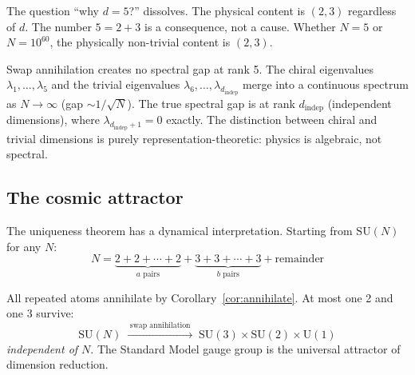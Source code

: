 \begin{remark}
\begin{corollary}
The question ``why $d = 5$?'' dissolves. The physical content is $(2, 3)$ regardless of $d$. The number $5 = 2 + 3$ is a consequence, not a cause. Whether $N = 5$ or $N = 10^{60}$, the physically non-trivial content is $(2, 3)$.
\end{corollary}

\begin{remark}
Swap annihilation creates no spectral gap at rank 5. The chiral eigenvalues $\lambda_1, \ldots, \lambda_5$ and the trivial eigenvalues $\lambda_6, \ldots, \lambda_{d_\text{indep}}$ merge into a continuous spectrum as $N \to \infty$ (gap $\sim 1/\sqrt{N}$). The true spectral gap is at rank $d_\text{indep}$ (independent dimensions), where $\lambda_{d_\text{indep}+1} = 0$ exactly. The distinction between chiral and trivial dimensions is purely representation-theoretic: physics is algebraic, not spectral.
\end{remark}

\subsection{The cosmic attractor}

The uniqueness theorem has a dynamical interpretation. Starting from $\text{SU}(N)$ for any $N$:
\begin{equation}
N = \underbrace{2 + 2 + \cdots + 2}_{a\text{ pairs}} + \underbrace{3 + 3 + \cdots + 3}_{b\text{ pairs}} + \text{remainder}
\end{equation}

All repeated atoms annihilate by Corollary~\ref{cor:annihilate}. At most one 2 and one 3 survive:
\begin{equation}
\text{SU}(N) \;\xrightarrow{\;\text{swap annihilation}\;}\; \text{SU}(3) \times \text{SU}(2) \times \text{U}(1)
\end{equation}
\emph{independent of $N$}. The Standard Model gauge group is the universal attractor of dimension reduction.


\end{remark}
